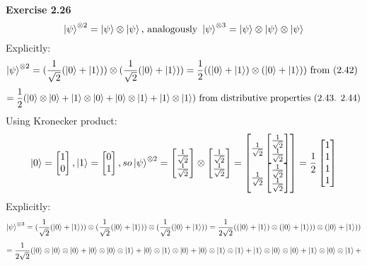 \documentclass{article}
\begin{document}
\begin{framed}
    \noindent \textbf{Exercise 2.26}
    $$\ket{\psi}^{\otimes2} = \ket{\psi} \otimes \ket{\psi} \text{, analogously } \ket{\psi}^{\otimes3} = \ket{\psi} \otimes \ket{\psi} \otimes \ket{\psi}$$
    Explicitly: 
    $$
    \ket{\psi}^{\otimes2} = (\frac{1}{\sqrt{2}}(\ket{0} + \ket{1})) \otimes (\frac{1}{\sqrt{2}}(\ket{0} + \ket{1})) = \frac{1}{2}((\ket{0} + \ket{1}) \otimes (\ket{0} + \ket{1})) \text{ from (2.42) }
    $$
    $$
    = \frac{1}{2}(\ket{0} \otimes \ket{0} + \ket{1} \otimes \ket{0} + \ket{0} \otimes \ket{1} + \ket{1} \otimes \ket{1}) \text{ from distributive properties (2.43. 2.44)}
    $$
    Using Kronecker product:
    $$
     \ket{0} = \begin{bmatrix}1 \\ 0\end{bmatrix}, \ket{1} = \begin{bmatrix}0 \\ 1\end{bmatrix}, so \ket{\psi}^{\otimes2} = \begin{bmatrix} \frac{1}{\sqrt{2}} \\ \frac{1}{\sqrt{2}}\end{bmatrix} \otimes \begin{bmatrix}\frac{1}{\sqrt{2}} \\ \frac{1}{\sqrt{2}}\end{bmatrix} = \begin{bmatrix}\frac{1}{\sqrt{2}}\begin{bmatrix}\frac{1}{\sqrt{2}} \\ \frac{1}{\sqrt{2}}\end{bmatrix} \\ \frac{1}{\sqrt{2}}\begin{bmatrix}\frac{1}{\sqrt{2}} \\ \frac{1}{\sqrt{2}}\end{bmatrix}\end{bmatrix} = \frac{1}{2}\begin{bmatrix}1 \\ 1\\ 1\\ 1\end{bmatrix}
    $$
    Explicitly: 
    $$
    \ket{\psi}^{\otimes3} = (\frac{1}{\sqrt{2}}(\ket{0} + \ket{1})) \otimes (\frac{1}{\sqrt{2}}(\ket{0} + \ket{1})) \otimes (\frac{1}{\sqrt{2}}(\ket{0} + \ket{1})) = \frac{1}{2\sqrt{2}}((\ket{0} + \ket{1}) \otimes (\ket{0} + \ket{1})) \otimes (\ket{0} + \ket{1}))
    $$
    $$
    = \frac{1}{2\sqrt{2}}(\ket{0} \otimes \ket{0} \otimes \ket{0} + \ket{0} \otimes \ket{0} \otimes \ket{1} + \ket{0} \otimes \ket{1} \otimes \ket{0} + \ket{0} \otimes \ket{1} \otimes \ket{1} + \ket{1} \otimes \ket{0} \otimes \ket{0} + \ket{1} \otimes \ket{0} \otimes \ket{1} + 
$$
\end{framed}
\end{document}
